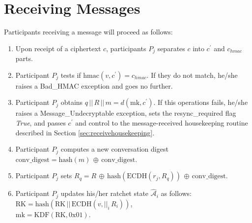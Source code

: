 \documentclass[%
preprint,
amsmath,amssymb,
aps,
prb,
floatfix,
]{revtex4-1}
\begin{document}
\section{\label{sec:receiving}Receiving Messages}
Participants receiving a message will proceed as follows:
\begin{enumerate}
\item Upon receipt of a ciphertext $c$, participants $P_j$ separates $c$ into
$c^\prime$ and $c_{hmac}$ parts.
\item Participant $P_j$ tests if $\mathrm{hmac}(v, c^\prime) = c_{hmac}$. If
they do not match, he/she raises a Bad\_HMAC exception and goes no further.
\item Participant $P_j$ obtains $q \, || \, R \, || \, m =
d(\mathrm{mk}, c^\prime)$.
If this operations fails, he/she raises a Message\_Undecryptable
exception, sets the resync\_required flag \textit{True},
and passes $c^\prime$ and control to the message-received housekeeping routine described in
Section \ref{sec:receivehousekeeping}.
\item Participant $P_j$ computes a new conversation digest
$\mathrm{conv\_digest} = \mathrm{hash}(m) \, \oplus \, \mathrm{conv\_digest}$.
\item Participant $P_j$ sets $R_q = R \, \oplus \,
\mathrm{hash}(\mathrm{ECDH}(r_j, R_q)) \, \oplus \, \mathrm{conv\_digest}$.
\item Participant $P_j$ updates his/her ratchet state $\mathcal{\hat{A}}_i$ as
follows: \\
$\mathrm{RK} = \mathrm{hash}(\mathrm{RK} \, || \, \mathrm{ECDH}(v, ||_i
\, R_i))$, \\
$\mathrm{mk} = \mathrm{KDF}(\mathrm{RK}, 0\mathrm{x}01)$.

\end{enumerate}
\end{document}
